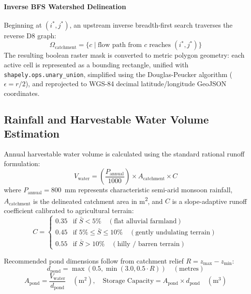 \documentclass[manuscript,screen,review]{acmart}
\begin{document}
\paragraph{Inverse BFS Watershed Delineation}
Beginning at $(i^*, j^*)$, an upstream inverse breadth-first search traverses the reverse D8 graph:
\begin{equation}
  \Omega_{\text{catchment}} = \{ c \mid \text{flow path from } c \text{ reaches } (i^*, j^*) \}
\end{equation}
The resulting boolean raster mask is converted to metric polygon geometry: each active cell is
represented as a bounding rectangle, unified with \texttt{shapely.ops.unary\_union}, simplified
using the Douglas-Peucker algorithm ($\epsilon = r/2$), and reprojected to WGS-84 decimal latitude/longitude
GeoJSON coordinates.

\subsection{Rainfall and Harvestable Water Volume Estimation}

Annual harvestable water volume is calculated using the standard rational runoff formulation:
\begin{equation}
  V_{\text{water}} = \left( \frac{P_{\text{annual}}}{1000} \right) \times A_{\text{catchment}} \times C
\end{equation}
where $P_{\text{annual}} = 800$~mm represents characteristic semi-arid monsoon rainfall,
$A_{\text{catchment}}$ is the delineated catchment area in m\textsuperscript{2}, and $C$ is a
slope-adaptive runoff coefficient calibrated to agricultural terrain:
\begin{equation}
  C = \begin{cases}
    0.35 & \text{if } \bar{S} < 5\% \quad (\text{flat alluvial farmland}) \\
    0.45 & \text{if } 5\% \le \bar{S} \le 10\% \quad (\text{gently undulating terrain}) \\
    0.55 & \text{if } \bar{S} > 10\% \quad (\text{hilly / barren terrain})
  \end{cases}
\end{equation}

Recommended pond dimensions follow from catchment relief $R = z_{\max} - z_{\min}$:
\begin{equation}
  d_{\text{pond}} = \max\left(0.5, \min(3.0, 0.5 \cdot R)\right) \quad (\text{metres})
\end{equation}
\begin{equation}
  A_{\text{pond}} = \frac{V_{\text{water}}}{d_{\text{pond}}} \quad (\text{m}^2), \quad
  \text{Storage Capacity} = A_{\text{pond}} \times d_{\text{pond}} \quad (\text{m}^3)
\end{equation}
\end{document}
